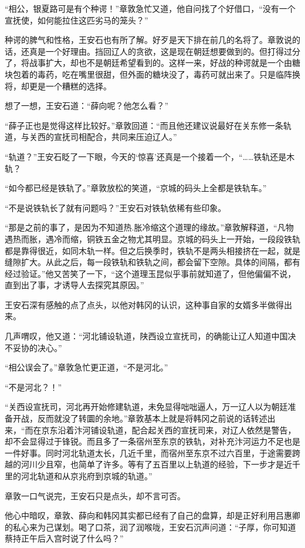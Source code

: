 “相公，银夏路可是有个种谔！”章敦急忙又道，他自问找了个好借口，“没有一个宣抚使，如何能拉住这匹劣马的笼头？”

种谔的脾气和性格，王安石也有所了解。好歹是天下排在前几的名将了。章敦说的话，还真是一个好理由。挡回辽人的贪欲，这是现在朝廷想要做到的。但打得过分了，将战事扩大，却也不是朝廷希望看到的。这样一来，好战的种谔就是一个由糖块包着的毒药，吃在嘴里很甜，但外面的糖块没了，毒药可就出来了。只是临阵换将，却更是一个糟糕的选择。

想了一想，王安石道：“薛向呢？他怎么看？”

“薛子正也是觉得这样比较好。”章敦回道：“而且他还建议说最好在关东修一条轨道，与关西的宣抚司相配合，共同来压迫辽人。”

“轨道？”王安石眨了一下眼，今天的‘惊喜’还真是一个接着一个，“……铁轨还是木轨？

“如今都已经是铁轨了。”章敦放松的笑道，“京城的码头上全都是铁轨车。”

“不是说铁轨长了就有问题吗？”王安石对铁轨依稀有些印象。

“那是之前的事了，是因为不知道热.胀冷缩这个道理的缘故。”章敦解释道，“凡物遇热而胀，遇冷而缩，铜铁五金之物尤其明显。京城的码头上一开始，一段段铁轨都是靠得很近，如同木轨一样。但之后换季时，铁轨不是两头相接挤在一起，就是缝隙扩大。从此之后，每一段铁轨和铁轨之间，都会留下空隙。具体的间隔，都有经过验证。”他又苦笑了一下，“这个道理玉昆似乎事前就知道了，但他偏偏不说，直到出了事，才诱导人去探究其原因。”

王安石深有感触的点了点头，以他对韩冈的认识，这种事自家的女婿多半做得出来。

几声喟叹，他又道：“河北铺设轨道，陕西设立宣抚司，的确能让辽人知道中国决不妥协的决心。”

“相公误会了。”章敦急忙更正道，“不是河北。”

“不是河北？！”

“关西设宣抚司，河北再开始修建轨道，未免显得咄咄逼人，万一辽人以为朝廷准备开战，反而就没了转圜的余地。”章敦基本上就是将韩冈之前说的话转述出来，“而在京东沿着汴河铺设轨道，配合起关西的宣抚司来，对辽人依然是警告，却不会显得过于锋锐。而且多了一条宿州至东京的铁轨，对补充汴河运力不足也是一件好事。同时河北轨道太长，几近千里，而宿州至东京不过六百里，于途需要跨越的河川少且窄，也简单了许多。等有了五百里以上轨道的经验，下一步才是近千里的河北轨道和从京兆府到京城的轨道。”

章敦一口气说完，王安石只是点头，却不言可否。

他心中暗叹，章敦、薛向和韩冈其实都已经有了自己的盘算，却是正好利用吕惠卿的私心来为己谋划。喝了口茶，润了润喉咙，王安石沉声问道：“子厚，你可知道蔡持正午后入宫时说了什么吗？”

